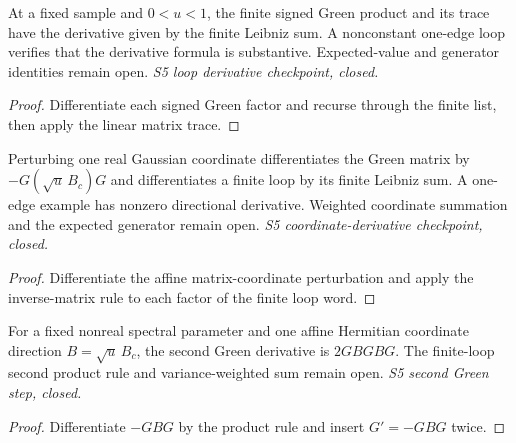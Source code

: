 \begin{lemma}
  \label{lem:loop-derivative}
  \leanok
  At a fixed sample and $0<u<1$, the finite signed Green product and its
  trace have the derivative given by the finite Leibniz sum. A nonconstant
  one-edge loop verifies that the derivative formula is substantive.
  Expected-value and generator identities remain open.
  \emph{S5 loop derivative checkpoint, closed.}
\end{lemma}
\begin{proof}\leanok
  Differentiate each signed Green factor and recurse through the finite list,
  then apply the linear matrix trace.
\end{proof}

\begin{lemma}
  \label{lem:loop-coordinate-derivative}
  \leanok
  Perturbing one real Gaussian coordinate differentiates the Green matrix by
  $-G(\sqrt u\,B_c)G$ and differentiates a finite loop by its finite
  Leibniz sum. A one-edge example has nonzero directional derivative.
  Weighted coordinate summation and the expected generator remain open.
  \emph{S5 coordinate-derivative checkpoint, closed.}
\end{lemma}
\begin{proof}\leanok
  Differentiate the affine matrix-coordinate perturbation and apply the
  inverse-matrix rule to each factor of the finite loop word.
\end{proof}

\begin{lemma}
  \label{lem:green-coordinate-second}
  \leanok
  For a fixed nonreal spectral parameter and one affine Hermitian coordinate
  direction $B=\sqrt u\,B_c$, the second Green derivative is $2GBGBG$.
  The finite-loop second product rule and variance-weighted sum remain open.
  \emph{S5 second Green step, closed.}
\end{lemma}
\begin{proof}\leanok
  Differentiate $-GBG$ by the product rule and insert $G'=-GBG$ twice.
\end{proof}

